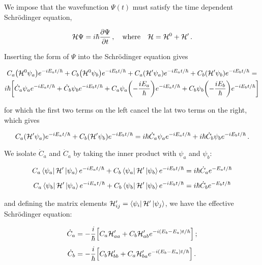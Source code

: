 \documentclass[12pt, titlepage]{article}
\begin{document}
We impose that the wavefunction $\Psi(t)$ must satisfy the time dependent Schrödinger equation,

\begin{equation}
	\mathcal{H}\Psi = i\hbar\pdv{\Psi}{t} \,, \quad\text{where}\quad \mathcal{H} = \mathcal{H}^0 + \mathcal{H}^\prime \,.
\end{equation}

Inserting the form of $\Psi$ into the Schrödinger equation gives

\begin{multline*}
	C_a\qty(\mathcal{H}^0\psi_a)e^{-iE_at/\hbar} + C_b\qty(\mathcal{H}^0\psi_b)e^{-iE_bt/\hbar} + C_a\qty(\mathcal{H}^\prime\psi_a)e^{-iE_at/\hbar} + C_b\qty(\mathcal{H}^\prime\psi_b)e^{-iE_bt/\hbar} =\\ i\hbar\qty[\dot{C}_a\psi_ae^{-iE_at/\hbar} + \dot{C}_b \psi_be^{-iE_bt/\hbar} + C_a\psi_a\qty(-\frac{iE_a}{\hbar})e^{-iE_a t/\hbar} + C_b\psi_b\qty(-\frac{iE_b}{\hbar})e^{-iE_b t/\hbar}]
\end{multline*}

for which the first two terms on the left cancel the lat two terms on the right, which gives

\begin{equation}
	C_a\qty(\mathcal{H}^\prime\psi_a)e^{-iE_at/\hbar} + C_b\qty(\mathcal{H}^\prime\psi_b)e^{-iE_bt/\hbar} = i\hbar\dot{C}_a\psi_ae^{-iE_at/\hbar} + i\hbar\dot{C}_b \psi_be^{-iE_bt/\hbar} \,.
\end{equation}

We isolate $\dot{C}_a$ and $\dot{C}_a$ by taking the inner product with $\psi_a$ and $\psi_b$:

\begin{subequations}
\begin{align}
	C_a\bra{\psi_a}\mathcal{H}^\prime\ket{\psi_a}e^{-iE_at/\hbar} + C_b\bra{\psi_a}\mathcal{H}^\prime\ket{\psi_b}e^{-iE_bt/\hbar} &= i\hbar\dot{C}_ae^{-E_at/\hbar} \\[4pt]
	C_a\bra{\psi_b}\mathcal{H}^\prime\ket{\psi_a}e^{-iE_at/\hbar} + C_b\bra{\psi_b}\mathcal{H}^\prime\ket{\psi_b}e^{-iE_bt/\hbar} &= i\hbar\dot{C}_be^{-E_bt/\hbar}
\end{align}
\end{subequations}

and defining the matrix elements $\mathcal{H}_{ij}^\prime = \bra{\psi_i}\mathcal{H}^\prime\ket{\psi_j}$, we have the effective Schrödinger equation:

\begin{subequations}
\begin{align}
	\dot{C}_a &= -\frac{i}{\hbar}\qty[C_a\mathcal{H}^\prime_{aa} + C_b\mathcal{H}^\prime_{ab}e^{-i(E_b-E_a)t/\hbar}] \,; \\[4pt]
	\dot{C}_b &= -\frac{i}{\hbar}\qty[C_b\mathcal{H}^\prime_{bb} + C_a\mathcal{H}^\prime_{ba}e^{-i(E_b-E_a)t/\hbar}] \,.
\end{align}
\end{subequations}
\end{document}
